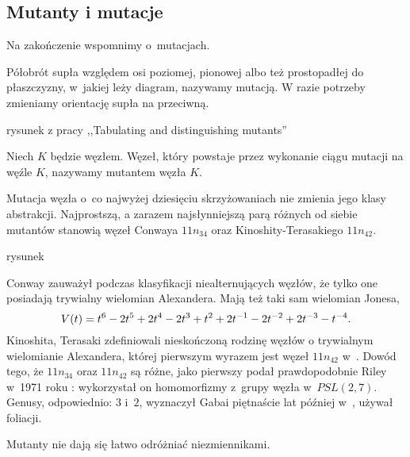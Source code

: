 \subsection{Mutanty i mutacje}
\label{sec:mutant}
Na zakończenie wspomnimy o~mutacjach.

\begin{definition}[mutacja]
    \label{def:mutacja}
    Półobrót supła względem osi poziomej, pionowej albo też prostopadłej do płaszczyzny, w~jakiej leży diagram, nazywamy mutacją.
    W razie potrzeby zmieniamy orientację supła na przeciwną.
\end{definition}

\begin{tobedone}
rysunek z pracy ,,Tabulating and distinguishing mutants''
\end{tobedone}

\begin{definition}[mutant]
    \label{def:mutant}
    Niech $K$ będzie węzłem.
    Węzeł, który powstaje przez wykonanie ciągu mutacji na węźle $K$, nazywamy mutantem węzła $K$.
\end{definition}

Mutacja węzła o~co najwyżej dziesięciu skrzyżowaniach nie zmienia jego klasy abstrakcji.
Najprostszą, a zarazem najsłynniejszą parą różnych od siebie mutantów stanowią węzeł Conwaya $11n_{34}$ oraz Kinoshity-Terasakiego $11n_{42}$.

\begin{tobedone}
rysunek
\end{tobedone}

Conway zauważył podczas klasyfikacji niealternujących węzłów, że tylko one posiadają trywialny wielomian Alexandera.
Mają też taki sam wielomian Jonesa,
\begin{equation}
    V(t) = t^{6} -2t^5 +2t^4 -2t^3 +t^2 +2t^{-1} -2t^{-2} +2t^{-3} -t^{-4}.
\end{equation}
Kinoshita, Terasaki zdefiniowali nieskończoną rodzinę węzłów o trywialnym wielomianie Alexandera, której pierwszym wyrazem jest węzeł $11n_{42}$ w~\cite{kinoshita57}.
Dowód tego, że $11n_{34}$ oraz $11n_{42}$ są różne, jako pierwszy podał prawdopodobnie Riley w~1971 roku \cite{riley71}: wykorzystał on homomorfizmy z~grupy węzła w~$PSL(2, 7)$.
Genusy, odpowiednio: $3$ i~$2$, wyznaczył Gabai piętnaście lat później w~\cite{gabai86}, używał foliacji.

Mutanty nie dają się łatwo odróżniać niezmiennikami.

